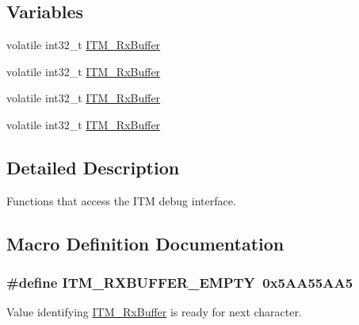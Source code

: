 \subsection*{Variables}
\begin{DoxyCompactItemize}
\item 
volatile int32\+\_\+t \hyperlink{group__CMSIS__core__DebugFunctions_ga12e68e55a7badc271b948d6c7230b2a8}{I\+T\+M\+\_\+\+Rx\+Buffer}
\item 
volatile int32\+\_\+t \hyperlink{group__CMSIS__core__DebugFunctions_ga12e68e55a7badc271b948d6c7230b2a8}{I\+T\+M\+\_\+\+Rx\+Buffer}
\item 
volatile int32\+\_\+t \hyperlink{group__CMSIS__core__DebugFunctions_ga12e68e55a7badc271b948d6c7230b2a8}{I\+T\+M\+\_\+\+Rx\+Buffer}
\item 
volatile int32\+\_\+t \hyperlink{group__CMSIS__core__DebugFunctions_ga12e68e55a7badc271b948d6c7230b2a8}{I\+T\+M\+\_\+\+Rx\+Buffer}
\end{DoxyCompactItemize}


\subsection{Detailed Description}
Functions that access the I\+TM debug interface. 



\subsection{Macro Definition Documentation}
\subsubsection[{\texorpdfstring{I\+T\+M\+\_\+\+R\+X\+B\+U\+F\+F\+E\+R\+\_\+\+E\+M\+P\+TY}{ITM_RXBUFFER_EMPTY}}]{\setlength{\rightskip}{0pt plus 5cm}\#define I\+T\+M\+\_\+\+R\+X\+B\+U\+F\+F\+E\+R\+\_\+\+E\+M\+P\+TY~0x5\+A\+A55\+A\+A5}\hypertarget{group__CMSIS__core__DebugFunctions_gaa822cb398ee022b59e9e6c5d7bbb228a}{}\label{group__CMSIS__core__DebugFunctions_gaa822cb398ee022b59e9e6c5d7bbb228a}
Value identifying \hyperlink{group__CMSIS__core__DebugFunctions_ga12e68e55a7badc271b948d6c7230b2a8}{I\+T\+M\+\_\+\+Rx\+Buffer} is ready for next character. 
